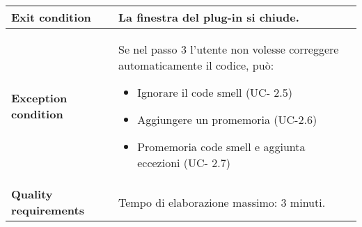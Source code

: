 \begin{tabular}{|l|p{13cm}|}
			\textbf{Exit condition}  &La finestra del plug-in si chiude.\\ \hline
			\textbf{Exception condition}  & Se nel passo 3 l'utente non volesse correggere automaticamente il codice, può:
			\begin{itemize} \item Ignorare il code smell (UC- 2.5)
				\item Aggiungere un promemoria (UC-2.6)
				\item Promemoria code smell e aggiunta eccezioni (UC- 2.7) 
			\end{itemize}
			\\ \hline
			\textbf{Quality requirements}  & Tempo di elaborazione massimo: 3 minuti.
			\\ \hline 
		\end{tabular}
		
		
		\vspace{2cm}
		

